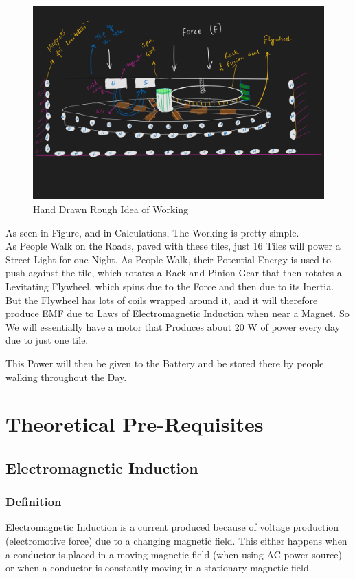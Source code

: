 \documentclass[11pt]{article}
\begin{document}
\begin{figure}[H]
	\centering
	\includegraphics[scale=0.3]{working.png}
	\caption{Hand Drawn Rough Idea of Working}
\end{figure}

As seen in Figure, and in Calculations, The Working is pretty simple. \\

As People Walk on the Roads, paved with these tiles, just 16 Tiles will power a Street Light for one Night. As People Walk, their Potential Energy is used to push against the tile, which rotates a Rack and Pinion Gear that then rotates a Levitating Flywheel, which spins due to the Force and then due to its Inertia.\\

But the Flywheel has lots of coils wrapped around it, and it will therefore produce EMF due to Laws of Electromagnetic Induction when near a Magnet. So We will essentially have a motor that Produces about 20 W of power every day due to just one tile. 

This Power will then be given to the Battery and be stored there by people walking throughout the Day. 


\section{Theoretical Pre-Requisites}
\subsection{Electromagnetic Induction}

\subsubsection{Definition}
Electromagnetic Induction is a current produced because of voltage production
(electromotive force) due to a changing magnetic field. This either happens when a conductor is placed in a moving magnetic field (when using AC power source) or when a conductor is constantly moving in a stationary magnetic field.
\end{document}
